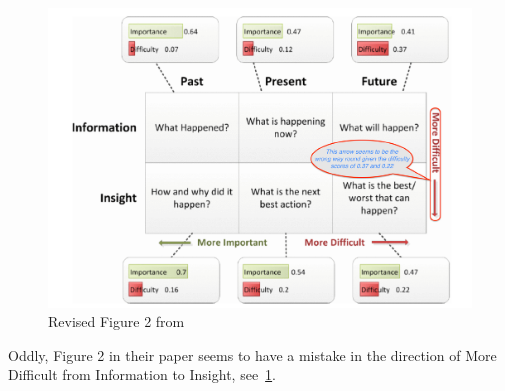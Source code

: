 
\begin{figure}
    \centering
    \includegraphics[width=\linewidth]{images/related-work/buse2012-edited-figure-2.pdf}
    \caption[Analytical questions, adapted from \cite{buse2012_information_needs_for_software_development_analytics}]{Revised Figure 2 from \cite{buse2012_information_needs_for_software_development_analytics}}
    \label{fig:buse2012-edited-figure-2}
\end{figure}

Oddly, Figure 2 in their paper seems to have a mistake in the direction of More Difficult from Information to Insight, see~\ref{fig:buse2012-edited-figure-2}.